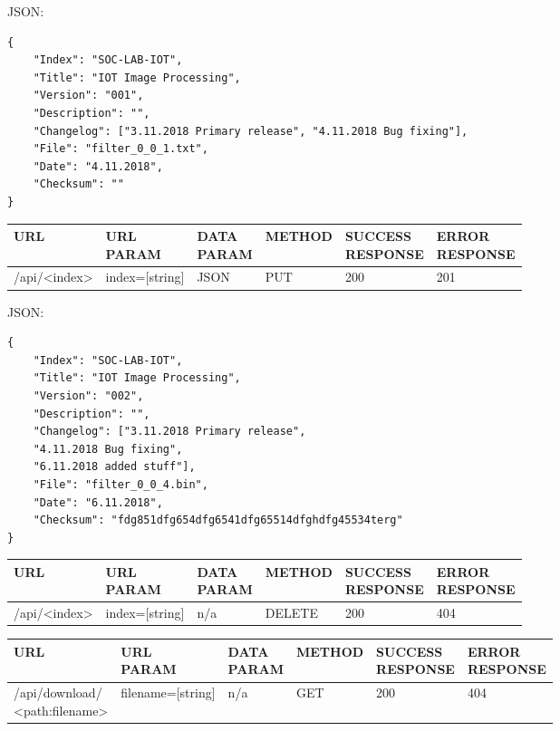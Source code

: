 JSON:
\begin{verbatim}
{
    "Index": "SOC-LAB-IOT",
    "Title": "IOT Image Processing",
    "Version": "001",
    "Description": "",
    "Changelog": ["3.11.2018 Primary release", "4.11.2018 Bug fixing"],
    "File": "filter_0_0_1.txt",
    "Date": "4.11.2018",
    "Checksum": ""
}	    
\end{verbatim}

\begin{table}[h]
    \begin{tabular}[h]{llllll}
    URL          & \specialcell{URL\\PARAM}     & \specialcell{DATA\\PARAM}  & METHOD &  \specialcell{SUCCESS\\RESPONSE} & \specialcell{ERROR\\RESPONSE} \\ \hline
    /api/<index> & index=[string] & JSON  & PUT    & 200              & 201            \\ 
    \end{tabular}
\end{table}

JSON:
\begin{verbatim}
{
    "Index": "SOC-LAB-IOT",
    "Title": "IOT Image Processing",
    "Version": "002",
    "Description": "",
    "Changelog": ["3.11.2018 Primary release", 
    "4.11.2018 Bug fixing", 
    "6.11.2018 added stuff"],
    "File": "filter_0_0_4.bin",
    "Date": "6.11.2018",
    "Checksum": "fdg851dfg654dfg6541dfg65514dfghdfg45534terg"
}	
\end{verbatim}

\begin{tabular}[h]{llllll}
URL          & \specialcell{URL\\PARAM}     & \specialcell{DATA\\PARAM}  & METHOD &  \specialcell{SUCCESS\\RESPONSE} & \specialcell{ERROR\\RESPONSE} \\ \hline
/api/<index> & index=[string] & n/a        & DELETE & 200              & 404            \\ 
\end{tabular}

\begin{tabular}[h]{llllll}
URL          & \specialcell{URL\\PARAM}     & \specialcell{DATA\\PARAM}  & METHOD &  \specialcell{SUCCESS\\RESPONSE} & \specialcell{ERROR\\RESPONSE} \\ \hline
\specialcell{/api/download/\\<path:filename>} &  filename=[string] & n/a        & GET    & 200              & 404            \\ 
\end{tabular}
